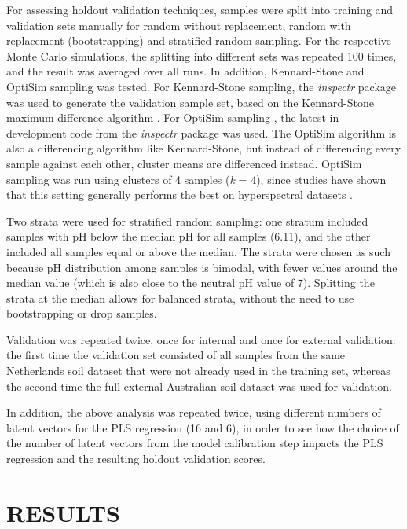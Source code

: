 \documentclass{isprs}
\begin{document}
For assessing holdout validation techniques, samples were split into training and validation sets manually for random without replacement, random with replacement (bootstrapping) and stratified random sampling. For the respective Monte Carlo simulations, the splitting into different sets was repeated 100 times, and the result was averaged over all runs. In addition, Kennard-Stone and OptiSim sampling was tested. For Kennard-Stone sampling, the \textit{inspectr} package was used to generate the validation sample set, based on the Kennard-Stone maximum difference algorithm \cite{kennard1969computer}. For OptiSim sampling \cite{clark1997optisim}, the latest in-development code from the \textit{inspectr} package was used. The OptiSim algorithm is also a differencing algorithm like Kennard-Stone, but instead of differencing every sample against each other, cluster means are differenced instead. OptiSim sampling was run using clusters of 4 samples (\textit{k} = 4), since studies have shown that this setting generally performs the best on hyperspectral datasets \cite{clark2003boosted}.

Two strata were used for stratified random sampling: one stratum included samples with pH below the median pH for all samples (6.11), and the other included all samples equal or above the median. The strata were chosen as such because pH distribution among samples is bimodal, with fewer values around the median value (which is also close to the neutral pH value of 7). Splitting the strata at the median allows for balanced strata, without the need to use bootstrapping or drop samples.

Validation was repeated twice, once for internal and once for external validation: the first time the validation set consisted of all samples from the same Netherlands soil dataset that were not already used in the training set, whereas the second time the full external Australian soil dataset was used for validation.

In addition, the above analysis was repeated twice, using different numbers of latent vectors for the PLS regression (16 and 6), in order to see how the choice of the number of latent vectors from the model calibration step impacts the PLS regression and the resulting holdout validation scores.

\section{RESULTS}\label{sec:RESULTS}
\end{document}
